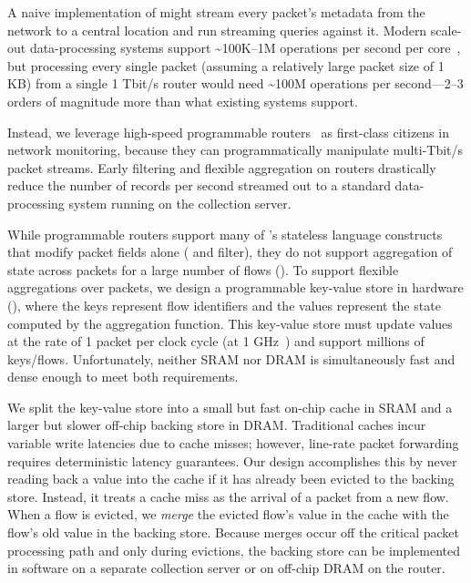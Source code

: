 A naive implementation of \TheSystem might stream every packet's metadata from
the network to a central location and run streaming queries against it. Modern
scale-out data-processing systems support \textasciitilde100K--1M operations
per second per core~\cite{kafka_benchmark, redis_benchmark,
memcached_benchmark, redis_vs_memcached_update, spark-streaming}, but
processing every single packet (assuming a relatively large packet size of 1
KB) from a single 1 Tbit/s router would need \textasciitilde100M operations per
second---2--3 orders of magnitude more than what existing systems support.

Instead, we leverage high-speed programmable routers~\cite{rmt, xpliant,
tofino, flexpipe} as first-class citizens in network monitoring, because they
can programmatically manipulate multi-Tbit/s packet streams.  Early filtering
and flexible aggregation on routers drastically reduce the number of records
per second streamed out to a standard data-processing system running on the
collection server.

While programmable routers support many of \TheSystem's stateless language
constructs that modify packet fields alone ( and {\ct filter}),
they do not support aggregation of state across packets for a large number of
flows (). To support flexible aggregations over packets, we
design a programmable key-value store in hardware (), where
the keys represent flow identifiers and the values represent the state computed
by the aggregation function. This key-value store must update values at the
rate of 1 packet per clock cycle (at 1 GHz~\cite{rmt, xpliant_sdk}) and support
millions of keys/flows.  Unfortunately, neither SRAM nor DRAM is simultaneously
fast and dense enough to meet both requirements.

We split the key-value store into a small but fast on-chip cache in SRAM and a
larger but slower off-chip backing store in DRAM. Traditional caches incur
variable write latencies due to cache misses; however, line-rate packet
forwarding requires deterministic latency guarantees. Our design accomplishes
this by never reading back a value into the cache if it has already been
evicted to the backing store. Instead, it treats a cache miss as the arrival of
a packet from a new flow. When a flow is evicted, we {\em merge} the evicted
flow's value in the cache with the flow's old value in the backing store.
Because merges occur off the critical packet processing path and only during
evictions, the backing store can be implemented in software on a separate
collection server or on off-chip DRAM on the router.

